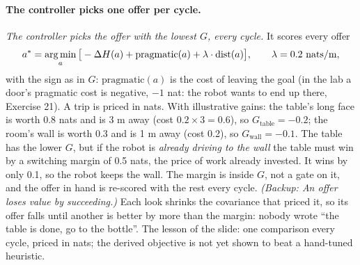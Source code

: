 \documentclass[11pt]{article}
\newcommand{\slt}[1]{\emph{#1}}   %
\begin{document}
\paragraph{The controller picks one offer per cycle.} \slt{The controller picks the offer with the lowest $G$, every cycle.} It scores every offer
\[
a^\ast=\operatorname*{arg\,min}_a\big[-\Delta H(a)+\mathrm{pragmatic}(a)+\lambda\cdot\mathrm{dist}(a)\big],\qquad\lambda=0.2\text{ nats/m},
\]
with the sign as in $G$: $\mathrm{pragmatic}(a)$ is the cost of leaving the goal (in the lab a door's pragmatic cost is negative, $-1$ nat: the robot wants to end up there, Exercise 21). A trip is priced in nats. With illustrative gains: the table's long face is worth 0.8 nats and is 3 m away (cost $0.2\times3=0.6$), so $G_{\text{table}}=-0.2$; the room's wall is worth 0.3 and is 1 m away (cost 0.2), so $G_{\text{wall}}=-0.1$. The table has the lower $G$, but if the robot is \emph{already driving to the wall} the table must win by a switching margin of 0.5 nats, the price of work already invested. It wins by only 0.1, so the robot keeps the wall. The margin is inside $G$, not a gate on it, and the offer in hand is re-scored with the rest every cycle. \slt{(Backup: An offer loses value by succeeding.)} Each look shrinks the covariance that priced it, so its offer falls until another is better by more than the margin: nobody wrote ``the table is done, go to the bottle''. The lesson of the slide: one comparison every cycle, priced in nats; the derived objective is not yet shown to beat a hand-tuned heuristic.

\begin{center}
\end{center}
\end{document}
